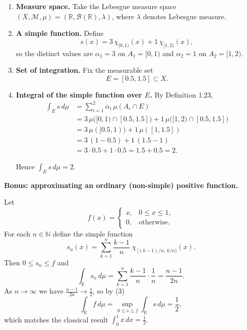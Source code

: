 \documentclass[12pt]{article}
\theoremstyle{definition} %
\theoremstyle{plain} %
\begin{document}
\begin{enumerate}
  \item \textbf{Measure space.}  
        Take the Lebesgue measure space $(X,\mathcal{M},\mu)
        =(\mathbb{R},\mathcal{B}(\mathbb{R}),\lambda)$,  
        where $\lambda$ denotes Lebesgue measure.

  \item \textbf{A simple function.}  
        Define
        \[
            s(x)=3\,\chi_{[0,1)}(x)+1\,\chi_{[1,2)}(x),
        \]
        so the distinct values are $\alpha_1=3$ on
        $A_1=[0,1)$ and $\alpha_2=1$ on $A_2=[1,2)$.

  \item \textbf{Set of integration.}  
        Fix the measurable set
        \[
            E=[0.5,1.5]\subset X.
        \]

  \item \textbf{Integral of the simple function over $E$.}  
        By Definition 1.23,
        \begin{align}
            \int_E s\,d\mu
            &=\sum_{i=1}^{2} \alpha_i\,\mu(A_i\cap E) \\[4pt]
            &=3\,\mu\bigl([0,1)\cap[0.5,1.5]\bigr)
              +1\,\mu\bigl([1,2)\cap[0.5,1.5]\bigr) \\[4pt]
            &=3\,\mu([0.5,1)) + 1\,\mu([1,1.5]) \\[4pt]
            &=3\,(1-0.5) + 1\,(1.5-1) \\[4pt]
            &=3\cdot 0.5 + 1\cdot 0.5 = 1.5 + 0.5 = 2.
        \end{align}

        Hence \(\displaystyle \int_E s\,d\mu = 2\).
\end{enumerate}

\medskip
\noindent
\textbf{Bonus: approximating an ordinary (non-simple) positive function.}

Let
\[
  f(x)=
  \begin{cases}
      x, & 0\le x\le 1,\\
      0, & \text{otherwise}.
  \end{cases}
\]
For each $n\in\mathbb{N}$ define the simple function
\[
  s_n(x)=\sum_{k=1}^{n}
          \frac{k-1}{n}\;
          \chi_{\,[(k-1)/n,\,k/n)}(x).
\]
Then \(0\le s_n\le f\) and
\[
  \int_{\mathbb{R}} s_n\,d\mu
    =\sum_{k=1}^{n}\frac{k-1}{n}\cdot\frac{1}{n}
    =\frac{n-1}{2n}.
\]
As \(n\to\infty\) we have \(\frac{n-1}{2n}\to\frac12\), so by (3)
\[
  \int_{\mathbb{R}} f\,d\mu
  =\sup_{\,0\le s\le f}\int_{\mathbb{R}} s\,d\mu
  =\frac12,
\]
which matches the classical result \(\displaystyle\int_0^1 x\,dx=\tfrac12\).
\pagebreak
\end{document}
